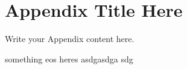 
\chapter{Appendix Title Here} %

\label{AppendixX} %


Write your Appendix content here.



something eos heres asdgasdga sdg 
